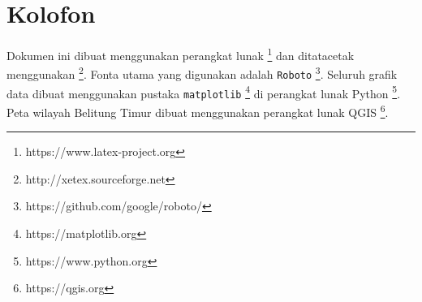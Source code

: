 \newpage{}\thispagestyle{empty}

\markboth{}{}
\section*{Kolofon}
Dokumen ini dibuat menggunakan perangkat lunak \LaTeXe \footnote{https://www.latex-project.org} dan ditatacetak menggunakan \XeLaTeX \footnote{http://xetex.sourceforge.net}.
Fonta utama yang digunakan adalah \texttt{Roboto} \footnote{https://github.com/google/roboto/}. Seluruh grafik data dibuat menggunakan pustaka \texttt{matplotlib} \footnote{https://matplotlib.org} di perangkat lunak Python \footnote{https://www.python.org}. Peta wilayah Belitung Timur dibuat menggunakan perangkat lunak QGIS \footnote{https://qgis.org}.

\clearpage{}